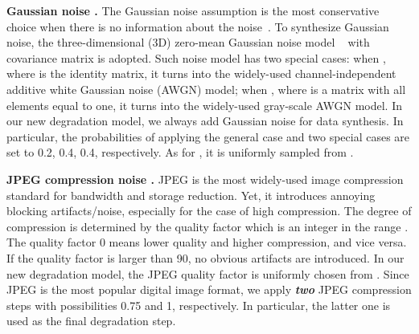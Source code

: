 \documentclass[10pt,twocolumn,letterpaper]{article}
\begin{document}
\begin{spacing}{1.5}
\end{spacing}
\noindent
\textbf{Gaussian noise .}
The Gaussian noise assumption is the most conservative choice when there is no information about the noise~\cite{park2013gaussian}.
To synthesize Gaussian noise, the three-dimensional (3D) zero-mean Gaussian noise model  ~\cite{nam2016holistic} with covariance matrix  is adopted.
Such noise model has two special cases: when , where  is the identity matrix, it turns into the widely-used channel-independent additive white Gaussian noise (AWGN) model; when , where  is a  matrix with all elements equal to one, it turns into the widely-used gray-scale AWGN model.
In our new degradation model, we always add Gaussian noise for data synthesis. In particular, the probabilities of applying the general case and two special cases are set to 0.2, 0.4, 0.4, respectively. As for , it is uniformly sampled from .


\begin{spacing}{1.5}
\end{spacing}
\noindent
\textbf{JPEG compression noise .}
JPEG is the most widely-used image compression standard for bandwidth and storage reduction. Yet, it introduces annoying  blocking artifacts/noise, especially for the case of high compression.
The degree of compression is determined by the quality factor which is an integer in the range . The quality factor 0 means lower quality and higher compression, and vice versa. If the quality factor is larger than 90, no obvious artifacts are introduced.
In our new degradation model, the JPEG quality
factor is uniformly chosen from . Since JPEG is the most popular digital image format, we apply \textbf{\emph{two}} JPEG compression steps with possibilities 0.75 and 1, respectively. In particular, the latter one is used as the final degradation step.
\end{document}
